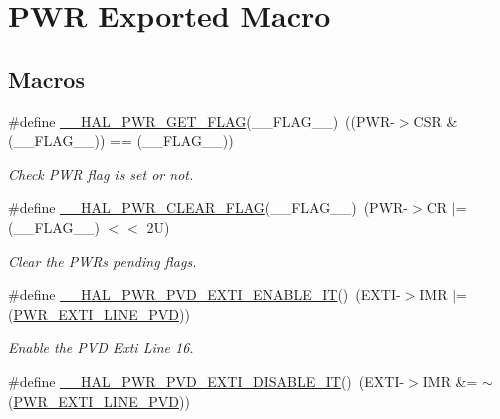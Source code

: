 \hypertarget{group___p_w_r___exported___macro}{}\section{P\+WR Exported Macro}
\label{group___p_w_r___exported___macro}
\subsection*{Macros}
\begin{DoxyCompactItemize}
\item 
\#define \hyperlink{group___p_w_r___exported___macro_ga2977135bbea35b786805eea640d1c884}{\+\_\+\+\_\+\+H\+A\+L\+\_\+\+P\+W\+R\+\_\+\+G\+E\+T\+\_\+\+F\+L\+AG}(\+\_\+\+\_\+\+F\+L\+A\+G\+\_\+\+\_\+)~((P\+WR-\/$>$C\+SR \& (\+\_\+\+\_\+\+F\+L\+A\+G\+\_\+\+\_\+)) == (\+\_\+\+\_\+\+F\+L\+A\+G\+\_\+\+\_\+))
\begin{DoxyCompactList}\small\item\em Check P\+WR flag is set or not. \end{DoxyCompactList}\item 
\#define \hyperlink{group___p_w_r___exported___macro_ga96f24bf4b16c9f944cd829100bf746e5}{\+\_\+\+\_\+\+H\+A\+L\+\_\+\+P\+W\+R\+\_\+\+C\+L\+E\+A\+R\+\_\+\+F\+L\+AG}(\+\_\+\+\_\+\+F\+L\+A\+G\+\_\+\+\_\+)~(P\+WR-\/$>$CR $\vert$=  (\+\_\+\+\_\+\+F\+L\+A\+G\+\_\+\+\_\+) $<$$<$ 2\+U)
\begin{DoxyCompactList}\small\item\em Clear the P\+WR\textquotesingle{}s pending flags. \end{DoxyCompactList}\item 
\#define \hyperlink{group___p_w_r___exported___macro_ga3180f039cf14ef78a64089f387f8f9c2}{\+\_\+\+\_\+\+H\+A\+L\+\_\+\+P\+W\+R\+\_\+\+P\+V\+D\+\_\+\+E\+X\+T\+I\+\_\+\+E\+N\+A\+B\+L\+E\+\_\+\+IT}()~(E\+X\+TI-\/$>$I\+MR $\vert$= (\hyperlink{group___p_w_r___p_v_d___e_x_t_i___line_ga43a49255649e03d2d2b6b12c5c379d2b}{P\+W\+R\+\_\+\+E\+X\+T\+I\+\_\+\+L\+I\+N\+E\+\_\+\+P\+VD}))
\begin{DoxyCompactList}\small\item\em Enable the P\+VD Exti Line 16. \end{DoxyCompactList}\item 
\#define \hyperlink{group___p_w_r___exported___macro_gad240d7bf8f15191b068497b9aead1f1f}{\+\_\+\+\_\+\+H\+A\+L\+\_\+\+P\+W\+R\+\_\+\+P\+V\+D\+\_\+\+E\+X\+T\+I\+\_\+\+D\+I\+S\+A\+B\+L\+E\+\_\+\+IT}()~(E\+X\+TI-\/$>$I\+MR \&= $\sim$(\hyperlink{group___p_w_r___p_v_d___e_x_t_i___line_ga43a49255649e03d2d2b6b12c5c379d2b}{P\+W\+R\+\_\+\+E\+X\+T\+I\+\_\+\+L\+I\+N\+E\+\_\+\+P\+VD}))
$$
\end{DoxyCompactItemize}
